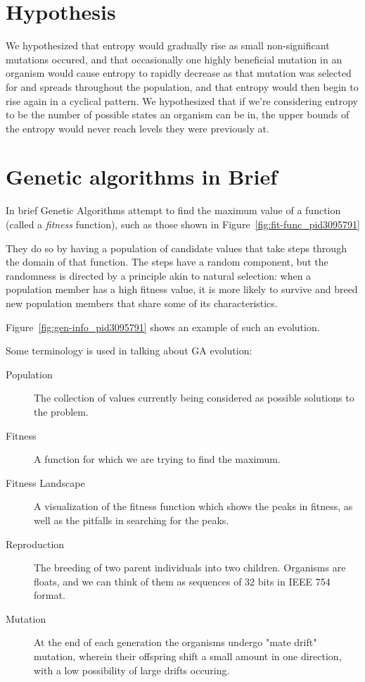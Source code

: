 \documentclass[11pt]{article}
\begin{document}
\section{Hypothesis}
\label{sec:org26a3be1}
We hypothesized that entropy would gradually rise as small
non-significant mutations occured, and that occasionally one highly
beneficial mutation in an organism would cause entropy to rapidly
decrease as that mutation was selected for and spreads throughout the
population, and that entropy would then begin to rise again in a
cyclical pattern. We hypothesized that if we're considering entropy to
be the number of possible states an organism can be in, the upper
bounds of the entropy would never reach levels they were previously
at.


\section{Genetic algorithms in Brief}

In brief Genetic Algorithms attempt to find the maximum value of a
function (called a \emph{fitness} function), such as those shown in
Figure~\ref{fig:fit-func_pid3095791}

They do so by having a population of candidate values that take steps
through the domain of that function.  The steps have a random
component, but the randomness is directed by a principle akin to
natural selection: when a population member has a high fitness value,
it is more likely to survive and breed new population members that
share some of its characteristics.

Figure~\ref{fig:gen-info_pid3095791} shows an example of such an
evolution.

Some terminology is used in talking about GA evolution:

\begin{description}
\item[Population] The collection of values currently being considered
  as possible solutions to the problem.
\item[Fitness] A function for which we are trying to find the maximum.
\item[Fitness Landscape] A visualization of the fitness function which
  shows the peaks in fitness, as well as the pitfalls in searching for
  the peaks.
\item[Reproduction] The breeding of two parent individuals into two
  children. Organisms are floats, and we can think of them as
  sequences of 32 bits in IEEE 754 format.
\item[Mutation] At the end of each generation the organisms undergo
  "mate drift" mutation, wherein their offspring shift a small amount
  in one direction, with a low possibility of large drifts occuring.
\end{description}
\end{document}
